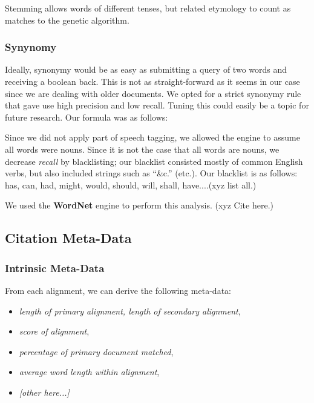 Stemming allows words of different tenses, but related etymology to count as matches to the genetic algorithm. 


\subsubsection{Synynomy}
Ideally, synonymy would be as easy as submitting a query of two words and receiving a boolean back. This is not as straight-forward as it seems in our case since we are dealing with older documents. We opted for a strict synonymy rule that gave use high precision and low recall. Tuning this could easily be a topic for future research. Our formula was as follows:

\vspace{5mm}
\vspace{5mm}

Since we did not apply part of speech tagging, we allowed the engine to assume all words were nouns. Since it is not the case that all words are nouns, we decrease \textit{recall} by blacklisting; our blacklist consisted mostly of common English verbs, but also included strings such as ``\&c.'' (etc.). Our blacklist is as follows: has, can, had, might, would, should, will, shall, have....(xyz list all.)

We used the \textbf{WordNet} engine to perform this analysis. (xyz Cite here.)

\subsection{Citation Meta-Data}

\subsubsection{Intrinsic Meta-Data}
From each alignment, we can derive the following meta-data:
	\begin{itemize}
		\item \textit{length of primary alignment, length of secondary alignment},
		\item \textit{score of alignment},
		\item \textit{percentage of primary document matched},
		\item \textit{average word length within alignment},
		\item \textit{[other here...]}
	\end{itemize}

